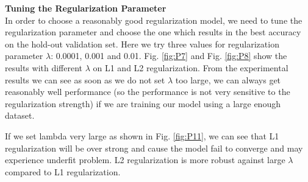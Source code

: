 \documentclass{article} %
\begin{document}
\textbf{Tuning the Regularization Parameter}\\
In order to choose a reasonably good regularization model, we need to tune the regularization parameter and choose the one which results in the best accuracy on the hold-out validation set. Here we try three values for regularization parameter $\lambda$: 0.0001, 0.001 and 0.01. Fig. \ref{fig:P7} and Fig. \ref{fig:P8} show the results with different $\lambda$ on L1 and L2 regularization. From the experimental results we can see as soon as we do not set $\lambda$ too large, we can always get reasonably well performance (so the performance is not very sensitive to the regularization strength) if we are training our model using a large enough dataset. 

If we set lambda very large as shown in Fig. \ref{fig:P11}, we can see that L1 regularization will be over strong and cause the model fail to converge and may experience underfit problem. L2 regularization is more robust against large $\lambda$ compared to L1 regularization.
\end{document}
